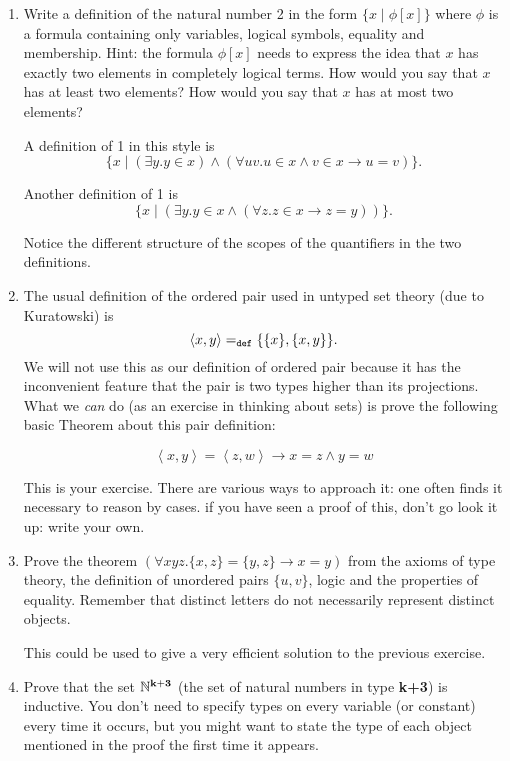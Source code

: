 \documentclass[12pt]{book}
\begin{document}
\begin{enumerate}

\item Write a definition of the natural number 2 in the form
$\{x \mid \phi[x]\}$ where $\phi$ is a formula containing only
variables, logical symbols, equality and membership.  Hint: the
formula $\phi[x]$ needs to express the idea that $x$ has exactly two
elements in completely logical terms.  How would you say that $x$
has at least two elements?  How would you say that $x$ has at most two elements?

A definition of 1 in this style is $$\{x \mid (\exists y.y \in x)
\wedge (\forall uv.u \in x \wedge v \in x \rightarrow u=v)\}.$$

Another definition of 1 is $$\{x \mid (\exists y.y \in x \wedge (\forall z.z\in x \rightarrow z=y))\}.$$

Notice the different structure of the scopes of the quantifiers in the
two definitions.

\item The usual definition of the ordered pair used in untyped set
theory (due to Kuratowski) is $$\left<x,y\right> =_{\tt def}
\{\{x\},\{x,y\}\}.$$ We will not use this as our definition of ordered
pair because it has the inconvenient feature that the pair is two
types higher than its projections.  What we {\em can\/} do (as an
exercise in thinking about sets) is prove the following basic Theorem
about this pair definition:

$$\left<x,y\right>=\left<z,w\right>\rightarrow x=z \wedge y=w$$

This is your exercise.  There are various ways to approach it: one
often finds it necessary to reason by cases.  if you have seen a proof
of this, don't go look it up: write your own.

\item
Prove the theorem $(\forall xyz.\{x,z\} = \{y,z\} \rightarrow x=y)$
from the axioms of type theory, the definition of unordered pairs
$\{u,v\}$, logic and the properties of equality.  Remember that
distinct letters do not necessarily represent distinct objects.

This could be used to give a very efficient solution to the previous
exercise.


\item  
Prove that the set $\mathbb N^{\bf k+3}$ (the set of natural numbers
in type {\bf k+3}) is inductive.  You don't need to specify types on
every variable (or constant) every time it occurs, but you might want
to state the type of each object mentioned in the proof the first time
it appears.


\end{enumerate}
\end{document}
